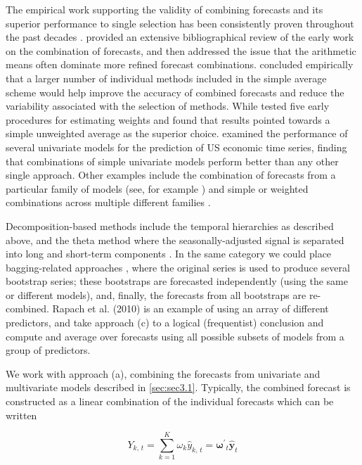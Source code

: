 \documentclass[
a4paper, %
12pt, %
]{CascadeAnalyticsWPS}
\begin{document}
The empirical work supporting the validity of combining forecasts and its superior performance to single selection has been consistently proven throughout the past decades \citep{makridakis2000, makridakis2020}. \cite{clemen89}
provided an extensive bibliographical review of the early work on the combination of forecasts, and
then addressed the issue that the arithmetic means often dominate more refined forecast combinations.
\cite{makridakis83} concluded empirically that a larger number of individual methods included in the simple average scheme would help improve the accuracy of combined forecasts and reduce the variability associated with the selection of methods. While \cite{winkler83} tested five early procedures for estimating weights and found that results pointed towards a simple unweighted average as the superior choice. \cite{stock_comparison_1998} examined the performance of several univariate models for the prediction of US economic time series, finding that combinations of simple univariate models perform better than any other single approach. Other examples include the combination of forecasts from a particular family of models (see, for example \cite{kourentzes_another_2019}) and simple or weighted combinations across multiple different families \citep{petropoulos_simple_2020, montero_2020}. 

Decomposition-based methods include the temporal hierarchies as described above, and the theta method where the seasonally-adjusted signal is separated into long and short-term components \citep{assimakopoulos_2000}. In the same category we could place bagging-related approaches \citep{bergmeir_2016, petropoulos_exploring_2018}, where the original series is used to produce several bootstrap series; these bootstraps are forecasted independently (using the same or different models), and, finally, the forecasts from all bootstraps are re-combined. Rapach et al. (2010) is an example of using an array of different predictors, and \cite{elliott_complete_2015} take approach (c) to a logical (frequentist) conclusion and compute and average over forecasts using all possible subsets of models from a group of predictors.


We work with approach (a), combining the forecasts from univariate and multivariate models described in \ref{sec:sec3.1}. Typically, the combined forecast is constructed as a linear combination of the individual forecasts \citep{newbold74, clemen86,petropoulos_simple_2020}
which can be written 

\begin{equation}
	Y_{k,\,t} = \sum\limits_{k =1}^{K}\omega_{k}\hat{y}_{k,\,t} = \bm{\omega^{\prime}}_{t}\hat{\mathbf{{y}}}_{t}
\end{equation}
\end{document}
